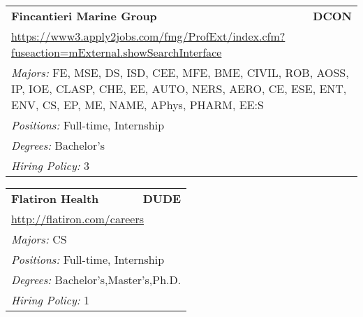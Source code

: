 \documentclass[twoside]{article}
\begin{document}
\begin{center}
\begin{multicols}{3}
\begin{FlushLeft}
\begin{minipage}{.9\columnwidth}\begin{tabularx}{.95\columnwidth}{Xr}
                 {\Large\bf Fincantieri Marine Group} & {\Large\bf DCON}\\
    \multicolumn{2}{p{.95\columnwidth}}{\url{https://www3.apply2jobs.com/fmg/ProfExt/index.cfm?fuseaction=mExternal.showSearchInterface}}\\
    \multicolumn{2}{p{.95\columnwidth}}{\emph{Majors:} FE, MSE, DS, ISD, CEE, MFE, BME, CIVIL, ROB, AOSS, IP, IOE, CLASP, CHE, EE, AUTO, NERS, AERO, CE, ESE, ENT, ENV, CS, EP, ME, NAME, APhys, PHARM, EE:S}\\
    \multicolumn{2}{p{.95\columnwidth}}{\emph{Positions:} Full-time, Internship}\\
    \multicolumn{2}{p{.95\columnwidth}}{\emph{Degrees:} Bachelor's}\\
    \multicolumn{2}{p{.95\columnwidth}}{\emph{Hiring Policy:} 3}\\
    \end{tabularx}
    
\end{minipage}
 
\begin{minipage}{.9\columnwidth}\begin{tabularx}{.95\columnwidth}{Xr}
                 {\Large\bf Flatiron Health} & {\Large\bf DUDE}\\
    \multicolumn{2}{p{.95\columnwidth}}{\url{http://flatiron.com/careers}}\\
    \multicolumn{2}{p{.95\columnwidth}}{\emph{Majors:} CS}\\
    \multicolumn{2}{p{.95\columnwidth}}{\emph{Positions:} Full-time, Internship}\\
    \multicolumn{2}{p{.95\columnwidth}}{\emph{Degrees:} Bachelor's,Master's,Ph.D.}\\
    \multicolumn{2}{p{.95\columnwidth}}{\emph{Hiring Policy:} 1}\\
    \end{tabularx}
    
\end{minipage}
 

\end{FlushLeft}
\end{multicols}
\end{center}
\end{document}
